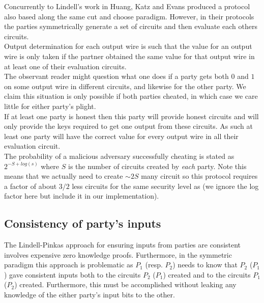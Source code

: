 \documentclass[ %
                    author={Nicholas Tutte},
                supervisor={Prof. Nigel Smart},
                    degree={MEng},
                     title={Secure Two Party Computation},
                  subtitle={A practical comparison of recent protocols},
                      type={Research - GG1K},
                      year={2015} ]{dissertation}
\begin{document}
				Concurrently to Lindell's work in \cite{Lindell_CnC_2013} Huang, Katz and Evans produced a protocol also based along the same cut and choose paradigm. However, in their protocols the parties symmetrically generate a set of circuits and then evaluate each others circuits.\\

				Output determination for each output wire is such that the value for an output wire is only taken if the partner obtained the same value for that output wire in at least one of their evaluation circuits.\\

				The observant reader might question what one does if a party gets both $0$ and $1$ on some output wire in different circuits, and likewise for the other party. We claim this situation is only possible if both parties cheated, in which case we care little for either party's plight.\\

				If at least one party is honest then this party will provide honest circuits and will only provide the keys required to get one output from these circuits. As such at least one party will have the correct value for every output wire in all their evaluation circuit.\\

				The probability of a malicious adversary successfully cheating is stated as $2^{-S + log(s)}$ where $S$ is the number of circuits created by \emph{each} party. Note this means that we actually need to create $\sim 2S$ many circuit so this protocol requires a factor of about $3/2$ less circuits for the same security level as \cite{LindellAndPinkas2011} (we ignore the log factor here but include it in our implementation).
				
			\subsection{Consistency of party's inputs} \label{sub:HKE_Consistency}
				The Lindell-Pinkas approach for ensuring inputs from parties are consistent involves expensive zero knowledge proofs. Furthermore, in the symmetric paradigm this approach is problematic as $P_1$ (resp. $P_2$) needs to know that $P_2$ ($P_1$) gave consistent inputs both to the circuits $P_2$ ($P_1$) created and to the circuits $P_1$ ($P_2$) created. Furthermore, this must be accomplished without leaking any knowledge of the either party's input bits to the other.\\
\end{document}
